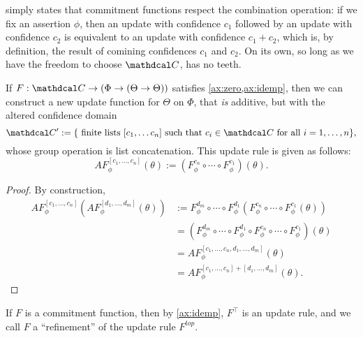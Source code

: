 \documentclass{article}
\def\cofunc{commitment function}
\def\confdom{\mathdcal C}
\begin{document}
 simply states that \cofunc s respect the combination operation: if we fix an assertion $\phi$, then an update with confidence $c_1$ followed by an update with confidence $c_2$ is equivalent to an update with confidence $c_1 + c_2$, which is, by definition, the result of comining confidences $c_1$ and $c_2$.
On its own, so long as we have the freedom to choose $\confdom$,  has no teeth.

\begin{prop}
    If $F: \confdom \to (\Phi \to (\Theta \to \Theta))$ satisfies \cref{ax:zero,ax:idemp}, then we can construct a new update
    function for $\Theta$ on $\Phi$, that \emph{is} additive, but with the altered confidence domain
    $$
        \confdom' := \{ \text{ finite lists } [c_1, \ldots c_n]
            \text{ such that } c_i \in \confdom \text{ for all } i = 1, \ldots, n \},
    $$
    whose group operation is list concatenation.
    This update rule is given as follows:
    \[
        AF^{[c_1, \ldots, c_n]}_\phi (\theta)  :=
                (F^{c_n}_\phi \circ \cdots \circ F^{c_1}_\phi) (\theta).
    \]
\end{prop}
\begin{proof}
By construction,
\begin{align*}
AF^{[c_1, \ldots, c_n]}_\phi ( AF^{[d_1, \ldots, d_m]}_\phi (\theta) )
        &:=
            F^{d_m}_\phi \circ \cdots \circ F^{d_1}_\phi (
            F^{c_n}_\phi \circ \cdots \circ F^{c_1}_\phi (\theta))\\
        &= (F^{d_m}_\phi \circ \cdots \circ F^{d_1}_\phi \circ
        F^{c_n}_\phi \circ \cdots \circ F^{c_1}_\phi) (\theta) \\
        &= AF^{[c_1, \ldots, c_n, d_1, \ldots, d_m]}_\phi (\theta) \\
        &= AF^{[c_1, \ldots, c_n] + [d_1, \ldots, d_m]}_\phi (\theta).
\end{align*}
\end{proof}

If $F$ is a \cofunc, then by \cref{ax:idemp}, $F^{\top}$ is an update rule, and we call $F$ a ``refinement'' of the update rule $F^{top}$.
\end{document}
